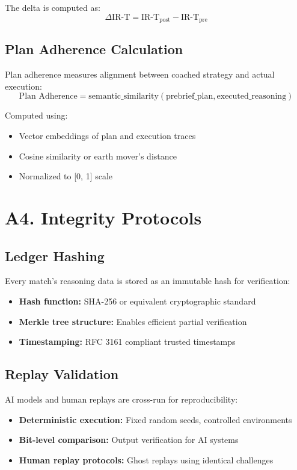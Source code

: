 The delta is computed as:
\begin{equation}
\Delta\text{IR-T} = \text{IR-T}_{\text{post}} - \text{IR-T}_{\text{pre}}
\end{equation}

\subsection{Plan Adherence Calculation}

Plan adherence measures alignment between coached strategy and actual execution:
\begin{equation}
\text{Plan Adherence} = \text{semantic\_similarity}(\text{prebrief\_plan}, \text{executed\_reasoning})
\end{equation}

Computed using:
\begin{itemize}[leftmargin=*]
  \item Vector embeddings of plan and execution traces
  \item Cosine similarity or earth mover's distance
  \item Normalized to [0, 1] scale
\end{itemize}

\section{A4. Integrity Protocols}

\subsection{Ledger Hashing}

Every match's reasoning data is stored as an immutable hash for verification:
\begin{itemize}[leftmargin=*]
  \item \textbf{Hash function:} SHA-256 or equivalent cryptographic standard
  \item \textbf{Merkle tree structure:} Enables efficient partial verification
  \item \textbf{Timestamping:} RFC 3161 compliant trusted timestamps
\end{itemize}

\subsection{Replay Validation}

AI models and human replays are cross-run for reproducibility:
\begin{itemize}[leftmargin=*]
  \item \textbf{Deterministic execution:} Fixed random seeds, controlled environments
  \item \textbf{Bit-level comparison:} Output verification for AI systems
  \item \textbf{Human replay protocols:} Ghost replays using identical challenges
\end{itemize}

